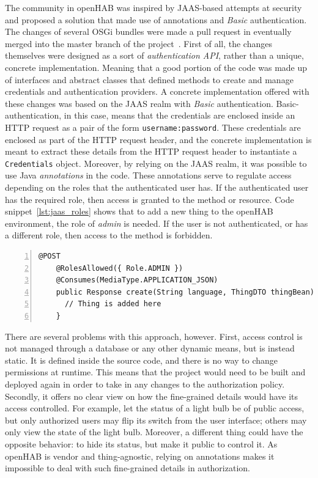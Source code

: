 \documentclass[12pt]{article}
\begin{document}
The community in openHAB was inspired by JAAS-based attempts at security and proposed a solution that made use of annotations and \emph{Basic} authentication. The changes of several OSGi bundles were made a pull request in eventually merged into the master branch of the project~\cite{esh_04}. First of all, the changes themselves were designed as a sort of \emph{authentication API}, rather than a unique, concrete implementation. Meaning that a good portion of the code was made up of interfaces and abstract classes that defined methods to create and manage credentials and authentication providers. A concrete implementation offered with these changes was based on the JAAS realm with \emph{Basic} authentication. Basic-authentication, in this case, means that the credentials are enclosed inside an HTTP request as a pair of the form \texttt{username:password}. These credentials are enclosed as part of the HTTP request header, and the concrete implementation is meant to extract these details from the HTTP request header to instantiate a \texttt{Credentials} object. Moreover, by relying on the JAAS realm, it was possible to use Java \emph{annotations} in the code. These annotations serve to regulate access depending on the roles that the authenticated user has. If the authenticated user has the required role, then access is granted to the method or resource. Code snippet~\ref{lst:jaas_roles} shows that to add a new thing to the openHAB environment, the role of \emph{admin} is needed. If the user is not authenticated, or has a different role, then access to the method is forbidden. 


\begin{lstlisting}[caption={Role-Based method restriction in ESH.},label={lst:jaas_roles},numbers=left]
    @POST
    @RolesAllowed({ Role.ADMIN })
    @Consumes(MediaType.APPLICATION_JSON)
    public Response create(String language, ThingDTO thingBean) {
      // Thing is added here
    }
\end{lstlisting}

There are several problems with this approach, however. First, access control is not managed through a database or any other dynamic means, but is instead static. It is defined inside the source code, and there is no way to change permissions at runtime. This means that the project would need to be built and deployed again in order to take in any changes to the authorization policy. Secondly, it offers no clear view on how the fine-grained details would have its access controlled. For example, let the status of a light bulb be of public access, but only authorized users may flip its switch from the user interface; others may only view the state of the light bulb. Moreover, a different thing could have the opposite behavior: to hide its status, but make it public to control it. As openHAB is vendor and thing-agnostic, relying on annotations makes it impossible to deal with such fine-grained details in authorization.
\end{document}
